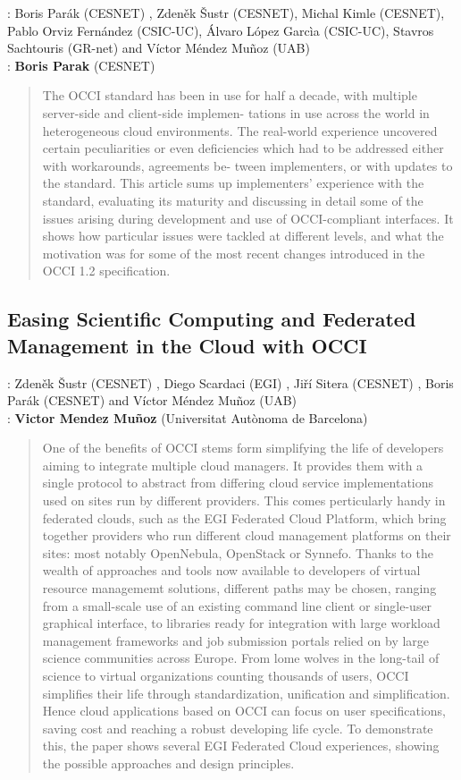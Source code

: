 \documentclass[10pt,a4paper]{article}
\begin{document}
: Boris Parák (CESNET) , Zdeněk Šustr (CESNET), Michal Kimle (CESNET), Pablo Orviz Fernández (CSIC-UC), \'Alvaro L\'opez Garc\`ia (CSIC-UC), Stavros Sachtouris (GR-net) and V\'ictor Méndez Muñoz (UAB)\\ 
: {\bf Boris Parak} (CESNET)

\begin{quote}
	The OCCI standard has been in use for half a decade, with multiple server-side and client-side implemen-
	tations in use across the world in heterogeneous cloud environments. The real-world experience uncovered
	certain peculiarities or even deficiencies which had to be addressed either with workarounds, agreements be-
	tween implementers, or with updates to the standard. This article sums up implementers’ experience with the
	standard, evaluating its maturity and discussing in detail some of the issues arising during development and
	use of OCCI-compliant interfaces. It shows how particular issues were tackled at different levels, and what
	the motivation was for some of the most recent changes introduced in the OCCI 1.2 specification.
\end{quote}

\subsection*{Easing Scientific Computing and Federated Management in the Cloud with OCCI}

: Zdeněk Šustr (CESNET) , Diego Scardaci (EGI) , Ji\v{r}\'i Sitera (CESNET) , Boris Par\'{a}k (CESNET) and V\'ictor M\'endez Mu\~{n}oz (UAB)\\
: {\bf Victor Mendez Mu\~{n}oz} (Universitat Aut\`onoma de Barcelona)

\begin{quote}
	One of the benefits of OCCI stems form simplifying the life of developers aiming to integrate multiple cloud
	managers. It provides them with a single protocol to abstract from differing cloud service implementations
	used on sites run by different providers. This comes perticularly handy in federated clouds, such as the EGI
	Federated Cloud Platform, which bring together providers who run different cloud management platforms on
	their sites: most notably OpenNebula, OpenStack or Synnefo. Thanks to the wealth of approaches and tools
	now available to developers of virtual resource managememt solutions, different paths may be chosen,
	ranging from a small-scale use of an existing command line client or single-user graphical interface, to
	libraries ready for integration with large workload management frameworks and job submission portals relied
	on by large science communities across Europe. From lome wolves in the long-tail of science to virtual
	organizations counting thousands of users, OCCI simplifies their life through standardization, unification and
	simplification. Hence cloud applications based on OCCI can focus on user specifications, saving cost and
	reaching a robust developing life cycle. To demonstrate this, the paper shows several EGI Federated Cloud
	experiences, showing the possible approaches and design principles.
\end{quote}
\end{document}
